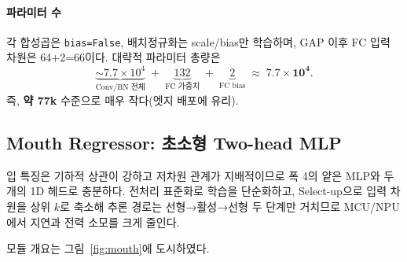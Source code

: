 \documentclass[10pt,a4paper]{article}
\begin{document}
\paragraph{파라미터 수} 각 합성곱은 \texttt{bias=False}, 배치정규화는 scale/bias만 학습하며, GAP 이후 FC 입력 차원은 64+2=66이다. 대략적 파라미터 총량은
\[
\underbrace{\sim 7.7\times10^4}_{\text{Conv/BN 전체}}\; +\; \underbrace{132}_{\text{FC 가중치}}\; +\; \underbrace{2}_{\text{FC bias}}\;\approx\; \mathbf{7.7\times10^4}.
\]
즉, \textbf{약 77k} 수준으로 매우 작다(엣지 배포에 유리).

\subsection{Mouth Regressor: 초소형 Two-head MLP}
입 특징은 기하적 상관이 강하고 저차원 관계가 지배적이므로 폭 4의 얕은 MLP와 두 개의 1D 헤드로 충분하다. 전처리 표준화로 학습을 단순화하고, Select-up으로 입력 차원을 상위 $k$로 축소해 추론 경로는 선형→활성→선형 두 단계만 거치므로 MCU/NPU에서 지연과 전력 소모를 크게 줄인다.

모듈 개요는 그림~\ref{fig:mouth}에 도시하였다.
\end{document}
